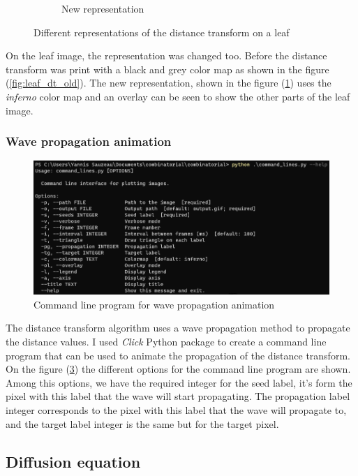 \begin{figure}[h]
\begin{subfigure}{0.54\textwidth}
        \caption{New representation}
        \label{fig:leaf_dt_new}
    \end{subfigure}
    \caption{Different representations of the distance transform on a leaf}
    \label{fig:leaf_dt}
\end{figure}

On the leaf image, the representation was changed too. Before the distance transform
was print with a black and grey color map as shown in the figure (\ref{fig:leaf_dt_old}). 
The new representation, shown in the figure (\ref{fig:leaf_dt_new}) uses the 
\textit{inferno} color map and an overlay can be seen to show the other parts of the 
leaf image.

\subsubsection{Wave propagation animation}

\begin{figure}[h]
    \centering
    \includegraphics[width=\textwidth]{figures/cli.png}
    \caption{Command line program for wave propagation animation}
    \label{fig:cli}
\end{figure}

The distance transform algorithm uses a wave propagation method to propagate the
distance values. I used \textit{Click} \cite{CLICK} Python package to create a
command line program that can be used to animate the propagation of the distance
transform. On the figure (\ref{fig:cli}) the different options for the command line
program are shown. Among this options, we have the required integer for the seed
label, it's form the pixel with this label that the wave will start propagating.
The propagation label integer corresponds to the pixel with this label that the wave
will propagate to, and the target label integer is the same but for the target pixel.

\subsection{Diffusion equation}

